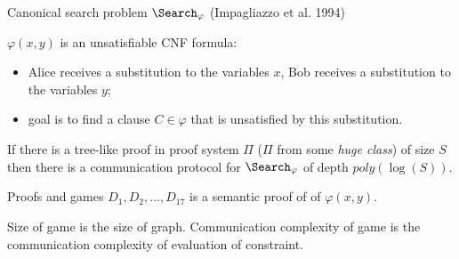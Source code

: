 \begin{frame}{Canonical search problem $\Search_{\varphi}$ (Impagliazzo et al. 1994)}

	
    $\varphi(x, y)$ is an unsatisfiable CNF formula:
    \begin{itemize}
        \item Alice receives a substitution to the variables $x$, Bob receives a substitution to the
            variables $y$;
        \item goal is to find a clause $C \in \varphi$ that is unsatisfied by this substitution.
    \end{itemize}

    \pause

    \begin{theorem}
        If there is a {\color{blue} tree-like} proof in proof system $\Pi$ ($\Pi$ from some \textit{huge
          class}) of size $S$ then there is a communication protocol for $\Search_{\varphi}$ of depth
        $poly(\log(S))$.
    \end{theorem}
    
\end{frame}


\begin{frame}{Proofs and games}
	$D_1, D_2, \dots, D_{17}$ is a semantic proof of of $\varphi(x, y)$.

    \begin{center}
    	    
    \end{center}

    \pause
    \pause
    \pause
    \pause
    \pause
    \pause
    \pause
    \pause
    \pause
    Size of game is the size of graph. Communication complexity of game is the communication complexity
    of evaluation of constraint.

\end{frame}




